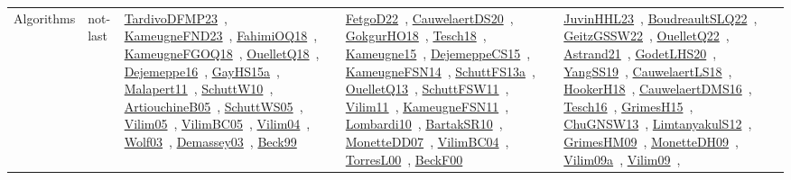 {\begin{longtable}{lp{3cm}>{\raggedright\arraybackslash}p{6cm}>{\raggedright\arraybackslash}p{6cm}>{\raggedright\arraybackslash}p{8cm}}
Algorithms & not-last & \href{works/TardivoDFMP23.pdf}{TardivoDFMP23}~\cite{TardivoDFMP23}, \href{works/KameugneFND23.pdf}{KameugneFND23}~\cite{KameugneFND23}, \href{works/FahimiOQ18.pdf}{FahimiOQ18}~\cite{FahimiOQ18}, \href{works/KameugneFGOQ18.pdf}{KameugneFGOQ18}~\cite{KameugneFGOQ18}, \href{works/OuelletQ18.pdf}{OuelletQ18}~\cite{OuelletQ18}, \href{works/Dejemeppe16.pdf}{Dejemeppe16}~\cite{Dejemeppe16}, \href{works/GayHS15a.pdf}{GayHS15a}~\cite{GayHS15a}, \href{works/Malapert11.pdf}{Malapert11}~\cite{Malapert11}, \href{works/SchuttW10.pdf}{SchuttW10}~\cite{SchuttW10}, \href{works/ArtiouchineB05.pdf}{ArtiouchineB05}~\cite{ArtiouchineB05}, \href{works/SchuttWS05.pdf}{SchuttWS05}~\cite{SchuttWS05}, \href{works/Vilim05.pdf}{Vilim05}~\cite{Vilim05}, \href{works/VilimBC05.pdf}{VilimBC05}~\cite{VilimBC05}, \href{works/Vilim04.pdf}{Vilim04}~\cite{Vilim04}, \href{works/Wolf03.pdf}{Wolf03}~\cite{Wolf03}, \href{works/Demassey03.pdf}{Demassey03}~\cite{Demassey03}, \href{works/Beck99.pdf}{Beck99}~\cite{Beck99} & \href{works/FetgoD22.pdf}{FetgoD22}~\cite{FetgoD22}, \href{works/CauwelaertDS20.pdf}{CauwelaertDS20}~\cite{CauwelaertDS20}, \href{works/GokgurHO18.pdf}{GokgurHO18}~\cite{GokgurHO18}, \href{works/Tesch18.pdf}{Tesch18}~\cite{Tesch18}, \href{works/Kameugne15.pdf}{Kameugne15}~\cite{Kameugne15}, \href{works/DejemeppeCS15.pdf}{DejemeppeCS15}~\cite{DejemeppeCS15}, \href{works/KameugneFSN14.pdf}{KameugneFSN14}~\cite{KameugneFSN14}, \href{works/SchuttFS13a.pdf}{SchuttFS13a}~\cite{SchuttFS13a}, \href{works/OuelletQ13.pdf}{OuelletQ13}~\cite{OuelletQ13}, \href{works/SchuttFSW11.pdf}{SchuttFSW11}~\cite{SchuttFSW11}, \href{works/Vilim11.pdf}{Vilim11}~\cite{Vilim11}, \href{works/KameugneFSN11.pdf}{KameugneFSN11}~\cite{KameugneFSN11}, \href{works/Lombardi10.pdf}{Lombardi10}~\cite{Lombardi10}, \href{works/BartakSR10.pdf}{BartakSR10}~\cite{BartakSR10}, \href{works/MonetteDD07.pdf}{MonetteDD07}~\cite{MonetteDD07}, \href{works/VilimBC04.pdf}{VilimBC04}~\cite{VilimBC04}, \href{works/TorresL00.pdf}{TorresL00}~\cite{TorresL00}, \href{works/BeckF00.pdf}{BeckF00}~\cite{BeckF00} & \href{works/JuvinHHL23.pdf}{JuvinHHL23}~\cite{JuvinHHL23}, \href{works/BoudreaultSLQ22.pdf}{BoudreaultSLQ22}~\cite{BoudreaultSLQ22}, \href{works/GeitzGSSW22.pdf}{GeitzGSSW22}~\cite{GeitzGSSW22}, \href{works/OuelletQ22.pdf}{OuelletQ22}~\cite{OuelletQ22}, \href{works/Astrand21.pdf}{Astrand21}~\cite{Astrand21}, \href{works/GodetLHS20.pdf}{GodetLHS20}~\cite{GodetLHS20}, \href{works/YangSS19.pdf}{YangSS19}~\cite{YangSS19}, \href{works/CauwelaertLS18.pdf}{CauwelaertLS18}~\cite{CauwelaertLS18}, \href{works/HookerH18.pdf}{HookerH18}~\cite{HookerH18}, \href{works/CauwelaertDMS16.pdf}{CauwelaertDMS16}~\cite{CauwelaertDMS16}, \href{works/Tesch16.pdf}{Tesch16}~\cite{Tesch16}, \href{works/GrimesH15.pdf}{GrimesH15}~\cite{GrimesH15}, \href{works/ChuGNSW13.pdf}{ChuGNSW13}~\cite{ChuGNSW13}, \href{works/LimtanyakulS12.pdf}{LimtanyakulS12}~\cite{LimtanyakulS12}, \href{works/GrimesHM09.pdf}{GrimesHM09}~\cite{GrimesHM09}, \href{works/MonetteDH09.pdf}{MonetteDH09}~\cite{MonetteDH09}, \href{works/Vilim09a.pdf}{Vilim09a}~\cite{Vilim09a}, \href{works/Vilim09.pdf}{Vilim09}~\cite{Vilim09}, 
\end{longtable}}
